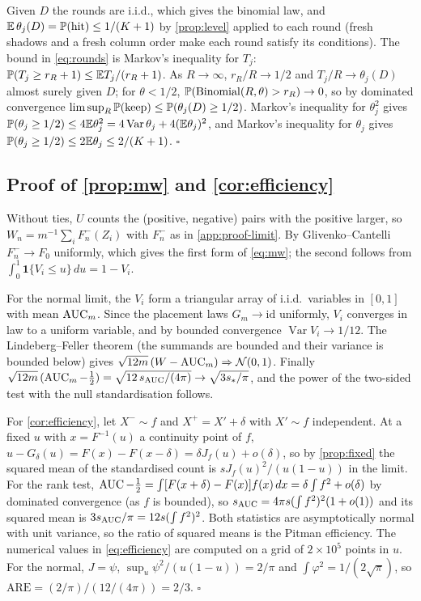 Given $D$ the rounds are i.i.d., which gives the binomial law, and $\E\,\theta_j(D) = \P(\text{hit}) \le 1/(K+1)$ by \cref{prop:level} applied to each round (fresh shadows and a fresh column order make each round satisfy its conditions). The bound in \eqref{eq:rounds} is Markov's inequality for $T_j$: $\P(T_j \ge r_R+1)\le \E T_j/(r_R+1)$. As $R\to\infty$, $r_R/R\to 1/2$ and $T_j/R\to\theta_j(D)$ almost surely given $D$; for $\theta < 1/2$, $\P(\Bin(R,\theta) > r_R)\to 0$, so by dominated convergence $\limsup_R\P(\text{keep})\le\P(\theta_j(D)\ge 1/2)$. Markov's inequality for $\theta_j^2$ gives $\P(\theta_j\ge 1/2)\le 4\E\theta_j^2 = 4\operatorname{Var}\theta_j + 4(\E\theta_j)^2$, and Markov's inequality for $\theta_j$ gives $\P(\theta_j\ge 1/2)\le 2\E\theta_j\le 2/(K+1)$. \hfill$\square$

\subsection{Proof of \texorpdfstring{\cref{prop:mw}}{Proposition 6} and \texorpdfstring{\cref{cor:efficiency}}{Corollary 2}}\label{app:proof-mw}

Without ties, $U$ counts the (positive, negative) pairs with the positive larger, so $W_n = m^{-1}\sum_i F^-_n(Z_i)$ with $F^-_n$ as in \cref{app:proof-limit}. By Glivenko--Cantelli $F^-_n\to F_0$ uniformly, which gives the first form of \eqref{eq:mw}; the second follows from $\int_0^1 \mathbf 1\{V_i\le u\}\,du = 1 - V_i$.

For the normal limit, the $V_i$ form a triangular array of i.i.d.\ variables in $[0,1]$ with mean $\AUC_m$. Since the placement laws $G_m\to\mathrm{id}$ uniformly, $V_i$ converges in law to a uniform variable, and by bounded convergence $\operatorname{Var}V_i \to 1/12$. The Lindeberg--Feller theorem (the summands are bounded and their variance is bounded below) gives $\sqrt{12m}\,(W - \AUC_m)\Rightarrow \mathcal N(0,1)$. Finally $\sqrt{12m}\,(\AUC_m - \tfrac12) = \sqrt{12\,\sauc/(4\pi)}\to\sqrt{3s_*/\pi}$, and the power of the two-sided test with the null standardisation follows.

For \cref{cor:efficiency}, let $X^- \sim f$ and $X^+ = X' + \delta$ with $X'\sim f$ independent. At a fixed $u$ with $x = F^{-1}(u)$ a continuity point of $f$, $u - G_\delta(u) = F(x) - F(x-\delta) = \delta J_f(u) + o(\delta)$, so by \cref{prop:fixed} the squared mean of the standardised count is $s J_f(u)^2/(u(1-u))$ in the limit. For the rank test, $\AUC - \tfrac12 = \int [F(x+\delta) - F(x)] f(x)\,dx = \delta\int f^2 + o(\delta)$ by dominated convergence (as $f$ is bounded), so $\sauc = 4\pi s(\int f^2)^2(1+o(1))$ and its squared mean is $3\sauc/\pi = 12 s(\int f^2)^2$. Both statistics are asymptotically normal with unit variance, so the ratio of squared means is the Pitman efficiency. The numerical values in \eqref{eq:efficiency} are computed on a grid of $2\times 10^5$ points in $u$. For the normal, $J = \psi$, $\sup_u\psi^2/(u(1-u)) = 2/\pi$ and $\int\varphi^2 = 1/(2\sqrt\pi)$, so $\mathrm{ARE} = (2/\pi)/(12/(4\pi)) = 2/3$. \hfill$\square$

